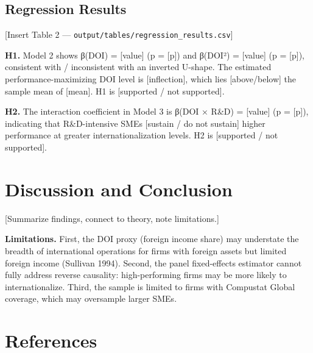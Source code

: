 \documentclass[
  11pt,
  letterpaper,
  DIV=11,
  numbers=noendperiod]{scrartcl}
\begin{document}
\subsection{Regression Results}\label{regression-results}

{[}Insert Table 2 --- \texttt{output/tables/regression\_results.csv}{]}

\textbf{H1.} Model 2 shows β(DOI) = {[}value{]} (p = {[}p{]}) and
β(DOI²) = {[}value{]} (p = {[}p{]}), consistent with / inconsistent with
an inverted U-shape. The estimated performance-maximizing DOI level is
{[}inflection{]}, which lies {[}above/below{]} the sample mean of
{[}mean{]}. H1 is {[}supported / not supported{]}.

\textbf{H2.} The interaction coefficient in Model 3 is β(DOI × R\&D) =
{[}value{]} (p = {[}p{]}), indicating that R\&D-intensive SMEs
{[}sustain / do not sustain{]} higher performance at greater
internationalization levels. H2 is {[}supported / not supported{]}.

\section{Discussion and Conclusion}\label{discussion-and-conclusion}

{[}Summarize findings, connect to theory, note limitations.{]}

\textbf{Limitations.} First, the DOI proxy (foreign income share) may
understate the breadth of international operations for firms with
foreign assets but limited foreign income (Sullivan 1994). Second, the
panel fixed-effects estimator cannot fully address reverse causality:
high-performing firms may be more likely to internationalize. Third, the
sample is limited to firms with Compustat Global coverage, which may
oversample larger SMEs.

\section{References}\label{references}
\end{document}
